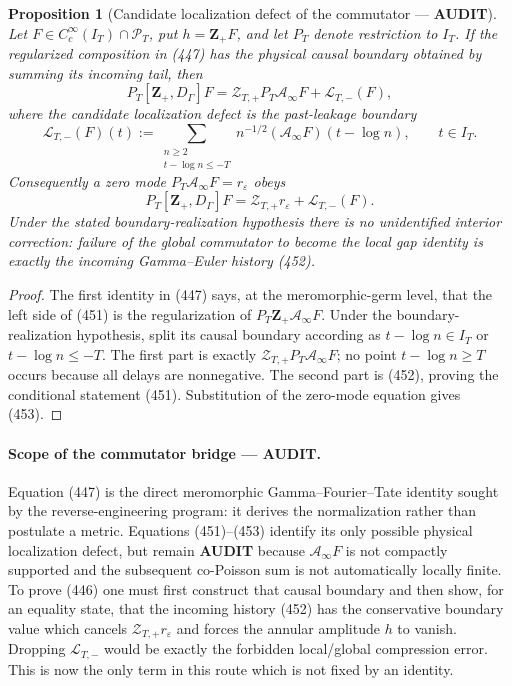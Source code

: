 \documentclass[11pt]{article}
\newtheorem{proposition}[theorem]{Proposition}
\newcommand{\AUDIT}{\textcolor{orange!75!black}{\textbf{AUDIT}}}
\begin{document}
\begin{proposition}[Candidate localization defect of the commutator ---
\AUDIT]
Let \(F\in C_c^\infty(I_T)\cap\mathcal P_T\), put
\(h=\mathbf Z_+F\), and let \(P_T\) denote restriction to \(I_T\).
If the regularized composition in (447) has the physical causal boundary
obtained by summing its incoming tail, then
\begin{equation}
 P_T[\mathbf Z_+,D_\Gamma]F
 =\mathcal Z_{T,+}P_T\mathcal A_\infty F
  +\mathcal L_{T,-}(F),                              \tag{451}
\end{equation}
where the candidate localization defect is the past-leakage boundary
\begin{equation}
 \mathcal L_{T,-}(F)(t)
 :=\sum_{\substack{n\ge2\\t-\log n\le -T}}
       n^{-1/2}(\mathcal A_\infty F)(t-\log n),
 \qquad t\in I_T.                                   \tag{452}
\end{equation}
Consequently a zero mode \(P_T\mathcal A_\infty F=r_\varepsilon\) obeys
\begin{equation}
 \boxed{
 P_T[\mathbf Z_+,D_\Gamma]F
 =\mathcal Z_{T,+}r_\varepsilon+\mathcal L_{T,-}(F).} \tag{453}
\end{equation}
Under the stated boundary-realization hypothesis there is no unidentified
interior correction: failure of the global commutator to become the local
gap identity is exactly the incoming Gamma--Euler history (452).
\end{proposition}

\begin{proof}
The first identity in (447) says, at the meromorphic-germ level, that the
left side of (451) is the regularization of
\(P_T\mathbf Z_+\mathcal A_\infty F\).  Under the boundary-realization
hypothesis, split its causal boundary according as
\(t-\log n\in I_T\) or \(t-\log n\le-T\).  The first
part is exactly
\(\mathcal Z_{T,+}P_T\mathcal A_\infty F\); no point
\(t-\log n\ge T\) occurs because all delays are nonnegative.  The second
part is (452), proving the conditional statement (451).  Substitution of
the zero-mode equation gives (453).
\end{proof}

\paragraph{Scope of the commutator bridge --- \AUDIT.}
Equation (447) is the direct meromorphic Gamma--Fourier--Tate identity
sought by the reverse-engineering program: it derives the normalization
rather than postulate a metric.  Equations (451)--(453) identify its only
possible physical localization defect, but remain \AUDIT{} because
\(\mathcal A_\infty F\) is not compactly supported and the subsequent
co-Poisson sum is not automatically locally finite.  To prove (446) one
must first construct that causal boundary and then show, for an equality
state, that the incoming history (452) has the
conservative boundary value which cancels
\(\mathcal Z_{T,+}r_\varepsilon\) and forces the annular amplitude \(h\)
to vanish.  Dropping \(\mathcal L_{T,-}\) would be exactly the forbidden
local/global compression error.  This is now the only term in this route
which is not fixed by an identity.
\end{document}
